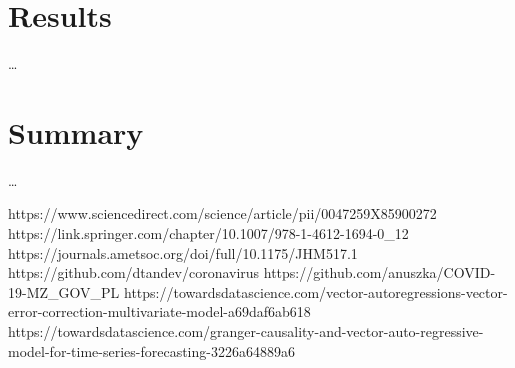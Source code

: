 \documentclass[conference]{IEEEtran}
\begin{document}
\section{Results}
\dots

\section{Summary}
\dots


\begin{thebibliography}{00}
 https://www.sciencedirect.com/science/article/pii/0047259X85900272
 https://link.springer.com/chapter/10.1007/978-1-4612-1694-0\_12
 https://journals.ametsoc.org/doi/full/10.1175/JHM517.1
 https://github.com/dtandev/coronavirus
 https://github.com/anuszka/COVID-19-MZ\_GOV\_PL
 https://towardsdatascience.com/vector-autoregressions-vector-error-correction-multivariate-model-a69daf6ab618
 https://towardsdatascience.com/granger-causality-and-vector-auto-regressive-model-for-time-series-forecasting-3226a64889a6
\end{thebibliography}
\vspace{12pt}
\end{document}
